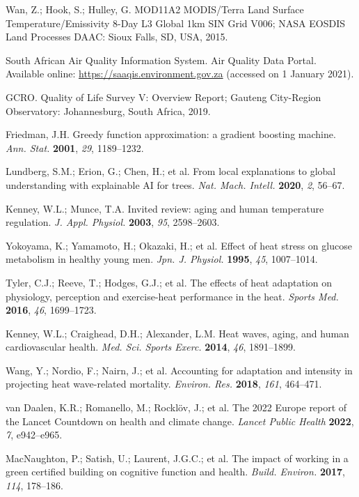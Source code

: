 \documentclass[journal,article,submit,pdftex,moreauthors]{Definitions/mdpi}
\begin{document}
\begin{thebibliography}{999}
Wan, Z.; Hook, S.; Hulley, G. MOD11A2 MODIS/Terra Land Surface Temperature/Emissivity 8-Day L3 Global 1km SIN Grid V006; NASA EOSDIS Land Processes DAAC: Sioux Falls, SD, USA, 2015.

South African Air Quality Information System. Air Quality Data Portal. Available online: \url{https://saaqis.environment.gov.za} (accessed on 1 January 2021).

GCRO. Quality of Life Survey V: Overview Report; Gauteng City-Region Observatory: Johannesburg, South Africa, 2019.

Friedman, J.H. Greedy function approximation: a gradient boosting machine. \emph{Ann. Stat.} \textbf{2001}, \emph{29}, 1189--1232.

Lundberg, S.M.; Erion, G.; Chen, H.; et al. From local explanations to global understanding with explainable AI for trees. \emph{Nat. Mach. Intell.} \textbf{2020}, \emph{2}, 56--67.

Kenney, W.L.; Munce, T.A. Invited review: aging and human temperature regulation. \emph{J. Appl. Physiol.} \textbf{2003}, \emph{95}, 2598--2603.

Yokoyama, K.; Yamamoto, H.; Okazaki, H.; et al. Effect of heat stress on glucose metabolism in healthy young men. \emph{Jpn. J. Physiol.} \textbf{1995}, \emph{45}, 1007--1014.

Tyler, C.J.; Reeve, T.; Hodges, G.J.; et al. The effects of heat adaptation on physiology, perception and exercise-heat performance in the heat. \emph{Sports Med.} \textbf{2016}, \emph{46}, 1699--1723.

Kenney, W.L.; Craighead, D.H.; Alexander, L.M. Heat waves, aging, and human cardiovascular health. \emph{Med. Sci. Sports Exerc.} \textbf{2014}, \emph{46}, 1891--1899.

Wang, Y.; Nordio, F.; Nairn, J.; et al. Accounting for adaptation and intensity in projecting heat wave-related mortality. \emph{Environ. Res.} \textbf{2018}, \emph{161}, 464--471.

van Daalen, K.R.; Romanello, M.; Rocklöv, J.; et al. The 2022 Europe report of the Lancet Countdown on health and climate change. \emph{Lancet Public Health} \textbf{2022}, \emph{7}, e942--e965.

MacNaughton, P.; Satish, U.; Laurent, J.G.C.; et al. The impact of working in a green certified building on cognitive function and health. \emph{Build. Environ.} \textbf{2017}, \emph{114}, 178--186.


\end{thebibliography}
\end{document}
